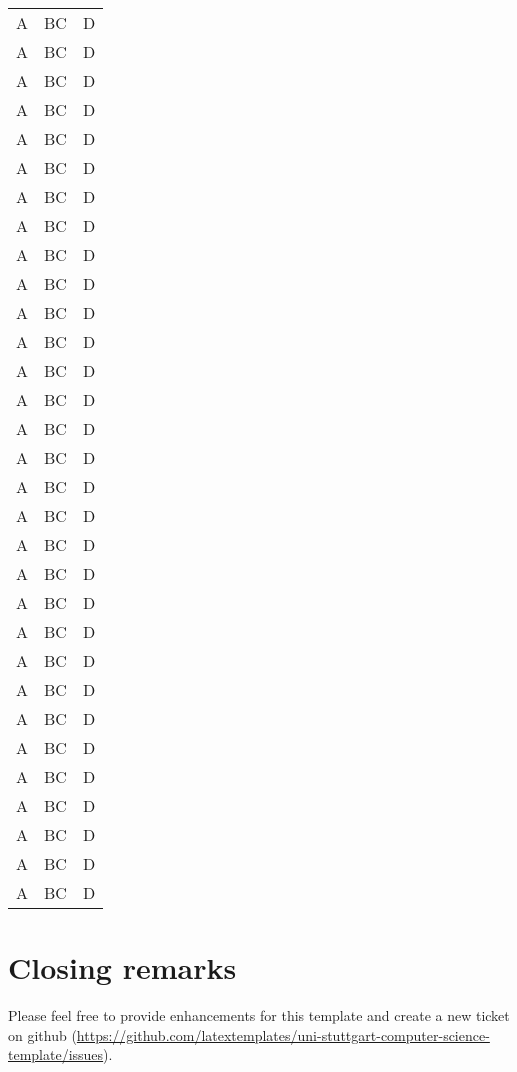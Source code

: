 \begin{longtable}{|l|l|l|}
A & BC & D \\
A & BC & D \\
A & BC & D \\
A & BC & D \\
A & BC & D \\
A & BC & D \\
A & BC & D \\
A & BC & D \\
A & BC & D \\
A & BC & D \\
A & BC & D \\
A & BC & D \\
A & BC & D \\
A & BC & D \\
A & BC & D \\
A & BC & D \\
A & BC & D \\
A & BC & D \\
A & BC & D \\
A & BC & D \\
A & BC & D \\
A & BC & D \\
A & BC & D \\
A & BC & D \\
A & BC & D \\
A & BC & D \\
A & BC & D \\
A & BC & D \\
A & BC & D \\
A & BC & D \\
A & BC & D \\
\end{longtable}



\section{Closing remarks}
Please feel free to provide enhancements for this template and create a new ticket on github (\url{https://github.com/latextemplates/uni-stuttgart-computer-science-template/issues}).
